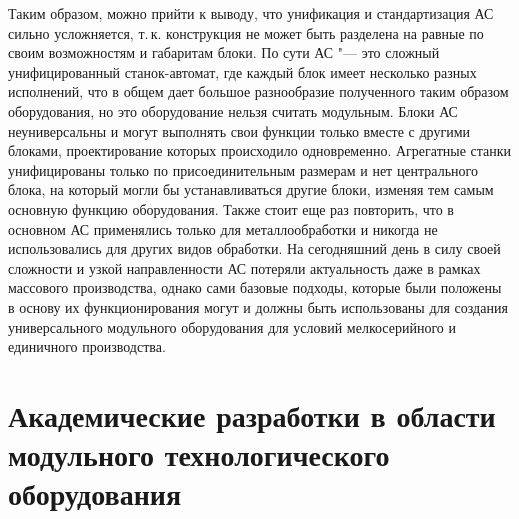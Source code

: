 Таким образом, можно прийти к выводу, что унификация и стандартизация АС сильно усложняется, т.\,к. конструкция не может быть разделена на равные по своим возможностям и габаритам блоки. По сути АС "--- это сложный унифицированный станок-автомат, где каждый блок имеет несколько разных исполнений, что в общем дает большое разнообразие полученного таким образом оборудования, но это оборудование нельзя считать модульным. Блоки АС неуниверсальны и могут выполнять свои функции только вместе с другими блоками, проектирование которых происходило одновременно. Агрегатные станки унифицированы только по присоединительным размерам и нет центрального блока, на который могли бы устанавливаться другие блоки, изменяя тем самым основную функцию оборудования. Также стоит еще раз повторить, что в основном АС применялись только для металлообработки и никогда не использовались для других видов обработки. На сегодняшний день в силу своей сложности и узкой направленности АС потеряли актуальность даже в рамках массового производства, однако сами базовые подходы, которые были положены в основу их функционирования могут и должны быть использованы для создания универсального модульного оборудования для условий мелкосерийного и единичного производства.

\section{Академические разработки в области модульного технологического оборудования} 

